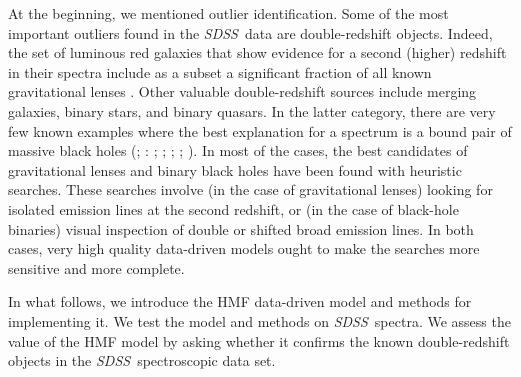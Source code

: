 \documentclass[12pt,preprint]{aastex}
\newcommand{\project}[1]{\textsl{#1}}
\newcommand{\sdss}{\project{SDSS}}
\begin{document}
At the beginning, we mentioned outlier identification.  Some of the
most important outliers found in the \sdss\ data are double-redshift
objects.  Indeed, the set of luminous red galaxies that show evidence
for a second (higher) redshift in their spectra include as a subset a
significant fraction of all known gravitational lenses \citep{bolton}.
Other valuable double-redshift sources include merging galaxies,
binary stars, and binary quasars.  In the latter category, there are
very few known examples where the best explanation for a spectrum is a
bound pair of massive black holes (\citealt{komossa};
\citealt{shields}: \citealt{boroson}; \citealt{decarli}; \citealt{barrows11}; 
\citealt{eracleous}; \citealt{tsalmantza}).  In most of the cases, the best
candidates  of gravitational lenses and binary black holes have been 
found with heuristic searches.  These searches
involve (in the case of gravitational lenses) looking for isolated
emission lines at the second redshift, or (in the case of black-hole
binaries) visual inspection of double or shifted broad emission lines.
In both cases, very high quality data-driven models ought to make the
searches more sensitive and more complete.

In what follows, we introduce the HMF data-driven model and methods
for implementing it.  We test the model and methods on \sdss\ spectra.
We assess the value of the HMF model by asking whether it confirms the
known double-redshift objects in the \sdss\ spectroscopic data set.
\end{document}
